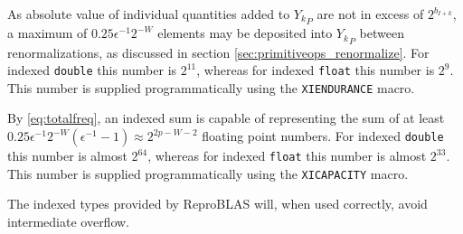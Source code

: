     As absolute value of individual quantities added to ${Y_k}_P$ are not in excess of $2^{b_{I + k}}$, a maximum of $0.25\epsilon^{-1}2^{-W}$ elements may be deposited into ${Y_k}_P$ between renormalizations, as discussed in section \ref{sec:primitiveops_renormalize}. For indexed \texttt{double} this number is $2^{11}$, whereas for indexed \texttt{float} this number is $2^9$. This number is supplied programmatically using the \texttt{XIENDURANCE} macro.

    By \eqref{eq:totalfreq}, an indexed sum is capable of representing the sum of at least $0.25\epsilon^{-1}2^{-W}  (\epsilon^{-1} - 1) \approx 2^{2  p - W - 2}$ floating point numbers. For indexed \texttt{double} this number is almost $2^{64}$, whereas for indexed \texttt{float} this number is almost $2^{33}$. This number is supplied programmatically using the \texttt{XICAPACITY} macro.

    The indexed types provided by ReproBLAS will, when used correctly, avoid intermediate overflow.

